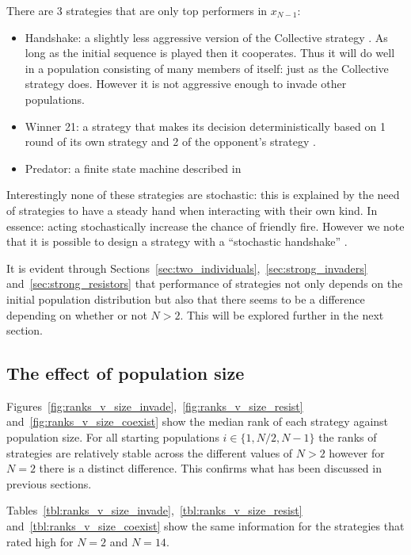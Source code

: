 \documentclass{article}
\begin{document}
There are 3 strategies that are only top performers in \(x_{N-1}\):

\begin{itemize}
    \item Handshake: a slightly less aggressive version of the Collective
        strategy \cite{robson1989}. As long as the initial sequence is played
        then it cooperates. Thus it will do well in a population consisting of
        many members of itself: just as the Collective strategy does. However it
        is not aggressive enough to invade other populations.
    \item Winner 21: a strategy that makes its decision deterministically based
        on 1 round of its own strategy and 2 of the opponent's strategy
        \cite{Mathieu2015}.
	\item Predator: a finite state machine described in~\cite{Ashlock2006}
\end{itemize}

Interestingly none of these strategies are stochastic: this is explained by
the need of strategies to have a steady hand when interacting with their own
kind. In essence: acting stochastically increase the chance of friendly fire.
However we note that it is possible to design a strategy with a ``stochastic
handshake'' \cite{Lee2015}.

It is evident through
Sections~\ref{sec:two_individuals},~\ref{sec:strong_invaders}
and~\ref{sec:strong_resistors} that performance of strategies not only depends
on the initial population distribution but also that there seems to be a
difference depending on whether or not \(N>2\). This will be explored further in
the next section.

\subsection{The effect of population size}\label{sec:population_size}

Figures~\ref{fig:ranks_v_size_invade},~\ref{fig:ranks_v_size_resist}
and~\ref{fig:ranks_v_size_coexist} show the median rank of each strategy against
population size. For all starting populations \(i\in\{1, N/2, N-1\}\) the ranks
of strategies are relatively stable across the different values of \(N>2\)
however for \(N=2\) there is a distinct difference. This confirms what has been
discussed in previous sections.

Tables~\ref{tbl:ranks_v_size_invade},~\ref{tbl:ranks_v_size_resist}
and~\ref{tbl:ranks_v_size_coexist} show the same information for the strategies
that rated high for \(N=2\) and \(N=14\).
\end{document}
